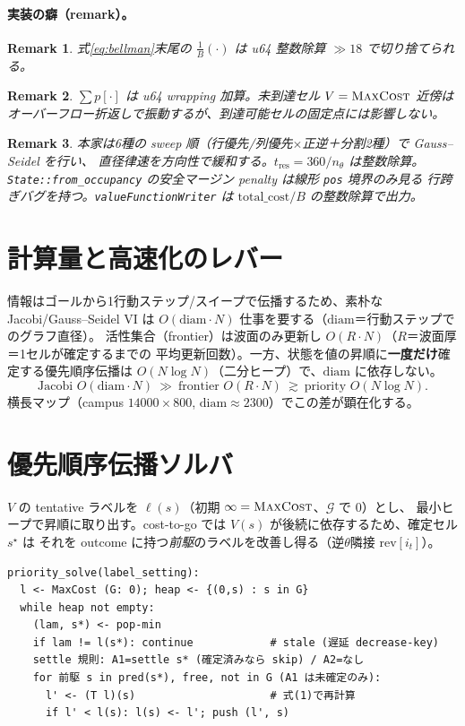 \documentclass[11pt]{article}
\newtheorem{remark}{Remark}
\begin{document}
\paragraph{実装の癖（remark）。}
\begin{remark}
式\eqref{eq:bellman}末尾の $\tfrac1B(\cdot)$ は u64 整数除算 $\gg18$ で切り捨てられる。
\end{remark}
\begin{remark}
$\sum p[\cdot]$ は u64 wrapping 加算。未到達セル $V=\textsc{MaxCost}$ 近傍は
オーバーフロー折返しで振動するが、到達可能セルの固定点には影響しない。
\end{remark}
\begin{remark}
本家は6種の sweep 順（行優先/列優先$\times$正逆＋分割2種）で Gauss--Seidel を行い、
直径律速を方向性で緩和する。$t_{\text{res}}=360/n_\theta$ は整数除算。
\texttt{State::from\_occupancy} の安全マージン penalty は線形 \texttt{pos} 境界のみ見る
行跨ぎバグを持つ。\texttt{valueFunctionWriter} は $\mathrm{total\_cost}/B$ の整数除算で出力。
\end{remark}

\section{計算量と高速化のレバー}
情報はゴールから1行動ステップ/スイープで伝播するため、素朴な Jacobi/Gauss--Seidel VI は
$O(\mathrm{diam}\cdot N)$ 仕事を要する（$\mathrm{diam}$＝行動ステップでのグラフ直径）。
活性集合（frontier）は波面のみ更新し $O(R\cdot N)$（$R$＝波面厚＝1セルが確定するまでの
平均更新回数）。一方、状態を値の昇順に\textbf{一度だけ}確定する優先順序伝播は
$O(N\log N)$（二分ヒープ）で、$\mathrm{diam}$ に依存しない。
\[
\text{Jacobi } O(\mathrm{diam}\cdot N)\ \gg\ \text{frontier } O(R\cdot N)\ \gtrsim\ \text{priority } O(N\log N).
\]
横長マップ（campus $14000\times800$, $\mathrm{diam}\approx2300$）でこの差が顕在化する。

\section{優先順序伝播ソルバ}
$V$ の tentative ラベルを $\ell(s)$（初期 $\infty=\textsc{MaxCost}$、$\mathcal{G}$ で $0$）とし、
最小ヒープで昇順に取り出す。cost-to-go では $V(s)$ が後続に依存するため、確定セル $s^\star$ は
それを outcome に持つ\emph{前駆}のラベルを改善し得る（逆$\theta$隣接 $\mathrm{rev}[i_t]$）。

\begin{verbatim}
priority_solve(label_setting):
  l <- MaxCost (G: 0); heap <- {(0,s) : s in G}
  while heap not empty:
    (lam, s*) <- pop-min
    if lam != l(s*): continue            # stale (遅延 decrease-key)
    settle 規則: A1=settle s* (確定済みなら skip) / A2=なし
    for 前駆 s in pred(s*), free, not in G (A1 は未確定のみ):
      l' <- (T l)(s)                     # 式(1)で再計算
      if l' < l(s): l(s) <- l'; push (l', s)
\end{verbatim}
\end{document}
